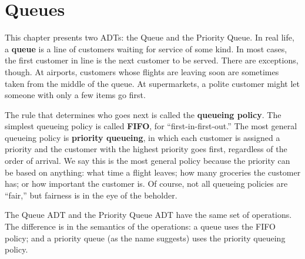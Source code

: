 



\chapter{Queues}
\label{queue}

This chapter presents two ADTs: the Queue and the Priority Queue.
In real life, a {\bf queue} is a line of customers waiting for service
of some kind.  In most cases, the first customer in line is the
next customer to be served.  There are exceptions, though.
At airports, customers whose flights are leaving soon
are sometimes taken from the middle of the queue.  At
supermarkets, a polite customer might let someone with only a
few items go first.

The rule that determines who goes next is called the
{\bf queueing policy}.  The simplest queueing policy is
called {\bf FIFO}, for ``first-in-first-out.''  The most general
queueing policy is {\bf priority queueing}, in which each customer
is assigned a priority and the customer with the highest priority
goes first, regardless of the order of arrival.  We
say this is the most general policy because the priority
can be based on anything: what time a flight leaves; how many
groceries the customer has; or how important the customer is.
Of course, not all queueing policies are ``fair,'' but
fairness is in the eye of the beholder.

The Queue ADT and the Priority Queue ADT have the same set
of operations.  The difference
is in the semantics of the operations: a queue uses the FIFO
policy; and a priority queue (as the name suggests) uses the
priority queueing policy.

